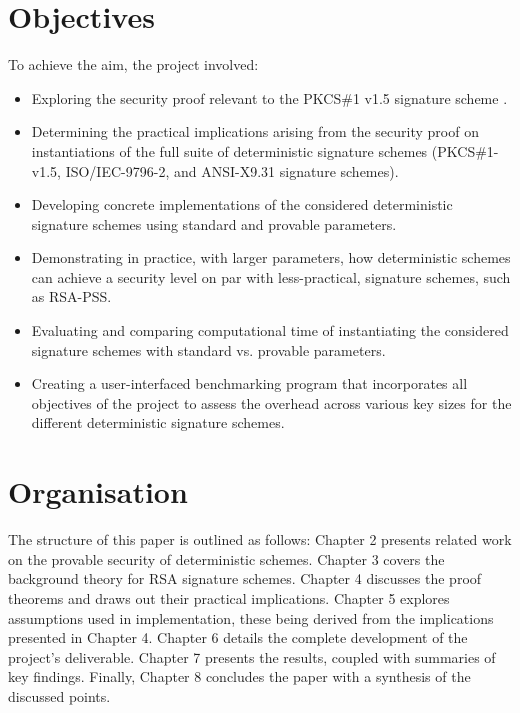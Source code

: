 \documentclass[]{final_report}
\theoremstyle{definition}
\begin{document}
\section{Objectives}
To achieve the aim, the project involved:
\begin{itemize}
    \item Exploring the security proof relevant to the PKCS\#1 v1.5 signature scheme .
    \item Determining the practical implications arising from the security proof on instantiations of the full suite of deterministic signature schemes (PKCS\#1-v1.5, ISO/IEC-9796-2, and ANSI-X9.31 signature schemes).
    \item Developing concrete implementations of the considered deterministic signature schemes using standard and provable parameters.
    \item Demonstrating in practice, with larger parameters, how deterministic schemes can achieve a security level on par with less-practical, signature schemes, such as RSA-PSS.
      \item Evaluating and comparing computational time of instantiating the considered signature schemes with standard vs. provable parameters. 
     \item Creating a user-interfaced benchmarking program that incorporates all objectives of the project to assess the overhead across various key sizes for the different deterministic signature schemes.

\end{itemize}

\section{Organisation}
The structure of this paper is outlined as follows: Chapter 2 presents related work on the provable security of deterministic schemes. Chapter 3 covers the background theory for RSA signature schemes. Chapter 4 discusses the proof theorems and draws out their practical implications. Chapter 5 explores assumptions used in implementation, these being derived from the implications presented in Chapter 4. Chapter 6 details the complete development of the project's deliverable. Chapter 7 presents the results, coupled with summaries of key findings. Finally, Chapter 8 concludes the paper with a synthesis of the discussed points.
\end{document}
